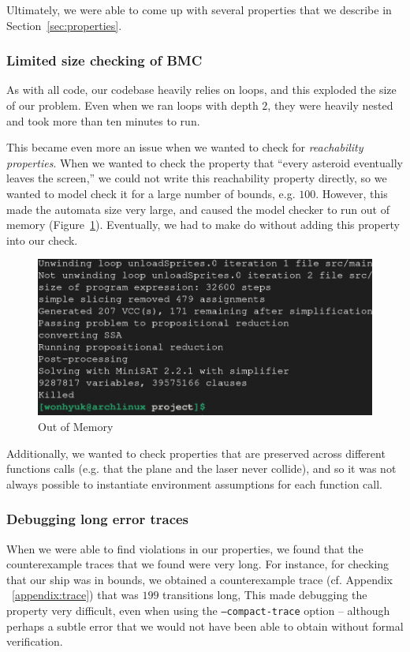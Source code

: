 \documentclass{article}
\begin{document}
Ultimately, we were able to come up with several properties that we describe in Section~\ref{sec:properties}.

\subsubsection{Limited size checking of BMC}
As with all code, our codebase heavily relies on loops, and this exploded the size of our problem.
Even when we ran loops with depth $2$, they were heavily nested and took more than ten minutes to run.

This became even more an issue when we wanted to check for \emph{reachability properties}.
When we wanted to check the property that ``every asteroid eventually leaves the screen,'' we could not write this reachability property directly, so we wanted to model check it for a large number of bounds, e.g. $100$.
However, this made the automata size very large, and caused the model checker to run out of memory (Figure~\ref{fig:killed}).
Eventually, we had to make do without adding this property into our check.

\begin{figure}[h!]
    \includegraphics[width=\linewidth]{killed.png}
    \caption{Out of Memory}
    \label{fig:killed}
\end{figure}

Additionally, we wanted to check properties that are preserved across different functions calls (e.g. that the plane and the laser never collide), and so it was not always possible to instantiate environment assumptions for each function call.


\subsubsection{Debugging long error traces}
When we were able to find violations in our properties, we found that the counterexample traces that we found were very long.
For instance, for checking that our ship was in bounds, we obtained a counterexample trace (cf. Appendix ~\ref{appendix:trace}) that was $199$ transitions long,
This made debugging the property very difficult, even when using the \texttt{--compact-trace} option --
although perhaps a subtle error that we would not have been able to obtain without formal verification.
\end{document}
